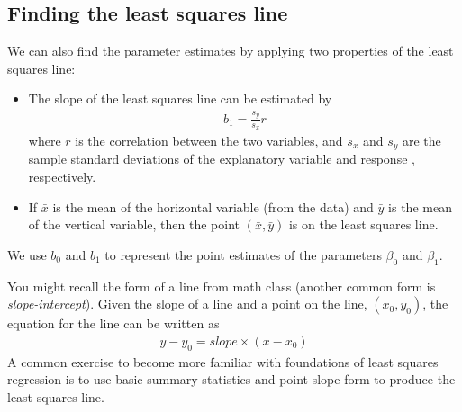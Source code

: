 

\subsection{Finding the least squares line}
\label{findingTheLeastSquaresLineSection}

We can also find the parameter estimates by applying two properties of the least squares line:
\begin{itemize}
\item The slope of the least squares line can be estimated by
\begin{eqnarray}
b_1 = \frac{s_y}{s_x} r
\label{slopeOfLSRLine}
\end{eqnarray}
where $r$ is the correlation between the two variables, and $s_x$ and $s_y$ are the sample standard deviations of the explanatory variable %
and response%
, respectively.
\item If $\bar{x}$ is the mean of the horizontal variable (from the data) and $\bar{y}$ is the mean of the vertical variable, then the point $(\bar{x}, \bar{y})$ is on the least squares line.
\end{itemize}
We use $b_0$ and $b_1$ to represent the point estimates of the parameters $\beta_0$ and $\beta_1$.

You might recall the  form of a line from math class (another common form is \emph{slope-intercept}). Given the slope of a line and a point on the line, $(x_0, y_0)$, the equation for the line can be written as
\begin{eqnarray}
y - y_0 = slope\times (x - x_0)
\label{pointSlopeFormForALine}
\end{eqnarray}
A common exercise to become more familiar with foundations of least squares regression is to use basic summary statistics and point-slope form to produce the least squares line. 

